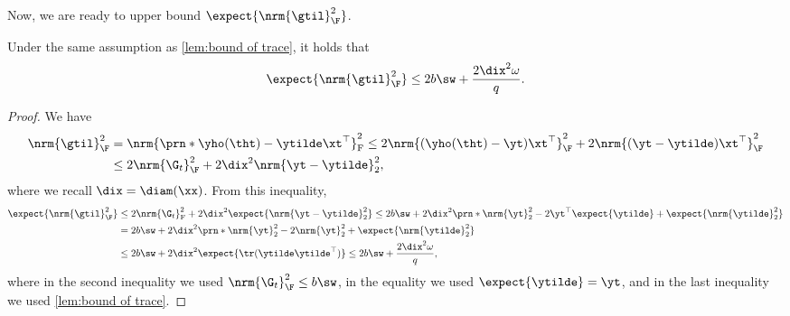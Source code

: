 Now, we are ready to upper bound $\expect{\nrm{\gtil}_\F^2}$.
\begin{lemma}
    \label{thm:evaluation of Gtilde}
    Under the same assumption as \cref{lem:bound of trace}, it holds that 
    \[
        \expect{\nrm{\gtil}_\F^2}\leq2b\sw+ \frac{2 \dix^2 \omega}{q}.
    \]
\end{lemma}
\begin{proof}
    We have 
    \begin{align*}
        \nrm{\gtil}_\F^2&=\nrm{\prn*{\yho(\tht)-\ytilde}\xt^\top}_{\mathrm{F}}^2\leq2\nrm{(\yho(\tht)-\yt)\xt^\top}_\F^2+2\nrm{(\yt-\ytilde)\xt^\top}_\F^2\\
        &\leq 2\nrm{\G_t}_\F^2+2\dix ^2\nrm{\yt-\ytilde}_2^2,
    \end{align*}
    where we recall $\dix =\diam(\xx)$.
    From this inequality, 
    \begin{align}
        \expect{\nrm{\gtil}_\F^2}&\leq2\nrm{\G_t}_{\mathrm{F}}^2+2\dix ^2\expect{\nrm{\yt-\ytilde}_2^2}
        \leq2b\sw+2\dix ^2\prn*{\nrm{\yt}_2^2-2\yt^\top\expect{\ytilde}+\expect{\nrm{\ytilde}_2^2}} \nonumber \\
        &=2b\sw+2\dix ^2\prn*{\nrm{\yt}_2^2-2\nrm{\yt}_2^2 + \expect{\nrm{\ytilde}_2^2}} \nonumber \\ 
        &\leq
        2b\sw
        +2\dix ^2\expect{\tr(\ytilde\ytilde^\top)}
        \leq
        2b\sw
        + \frac{2\dix^2 \omega}{q},
        \nonumber
    \end{align} 
    where in the second inequality we used $\nrm{\G_t}_\F^2 \leq b \sw$, in the equality we used $\expect{\ytilde}=\yt$,
    and in the last inequality we used \cref{lem:bound of trace}.
\end{proof}



